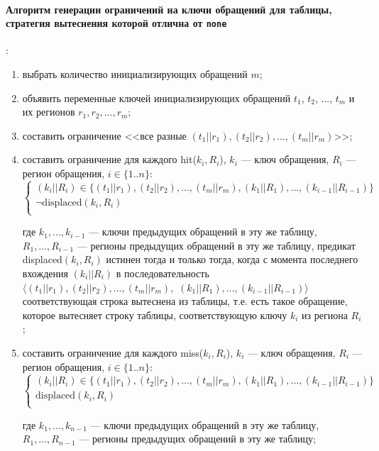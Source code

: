 \paragraph{Алгоритм генерации ограничений на ключи обращений для таблицы,
стратегия вытеснения которой отлична от \texttt{none}}:%
\begin{enumerate}
    \item выбрать количество инициализирующих обращений $m$;
    \item объявить переменные ключей инициализирующих обращений $t_1$, $t_2$, ..., $t_m$ и их регионов $r_1, r_2, ..., r_m$;
    \item составить ограничение <<все разные $(t_1||r_1), (t_2||r_2), ..., (t_m||r_m)$>>;
    \item составить ограничение для каждого hit($k_i, R_i$), $k_i$ --- ключ обращения, $R_i$ --- регион обращения, $i \in \{1..n\}$:
$$\left\{\begin{array}{l}
    (k_i||R_i) \in \{(t_1||r_1), (t_2||r_2), ..., (t_m||r_m), (k_1||R_1), ..., (k_{i-1}||R_{i-1}) \}\\
    \neg \mbox{displaced}(k_i, R_i)\\
\end{array}\right.$$

где $k_1, ..., k_{i-1}$ --- ключи предыдущих обращений в эту же таблицу,\\ $R_1,
..., R_{i-1}$ --- регионы предыдущих обращений в эту же таблицу, предикат displaced$(k_i, R_i)$ истинен тогда и только тогда, когда с момента последнего вхождения $(k_i||R_i)$ в последовательность $\langle (t_1||r_1), (t_2||r_2), ..., (t_m||r_m),$ $(k_1||R_1), ..., (k_{i-1}||R_{i-1})\rangle$ соответствующая строка вытеснена из таблицы, т.е. есть такое обращение, которое вытесняет строку таблицы, соответствующую ключу $k_i$ из региона $R_i$;

    \item составить ограничение для каждого miss($k_i, R_i$), $k_i$ --- ключ
обращения, $R_i$ --- регион обращения, $i \in \{1..n\}$:
$$\left\{\begin{array}{l}
    (k_i||R_i) \in \{(t_1||r_1), (t_2||r_2), ..., (t_m||r_m), (k_1||R_1), ...,
(k_{i-1}||R_{i-1}) \}\\
    \mbox{displaced}(k_i, R_i)\\
\end{array}\right.$$

где $k_1, ..., k_{n-1}$ --- ключи предыдущих обращений в эту же таблицу,\\ $R_1,
..., R_{n-1}$ --- регионы предыдущих обращений в эту же таблицу;


\end{enumerate}
